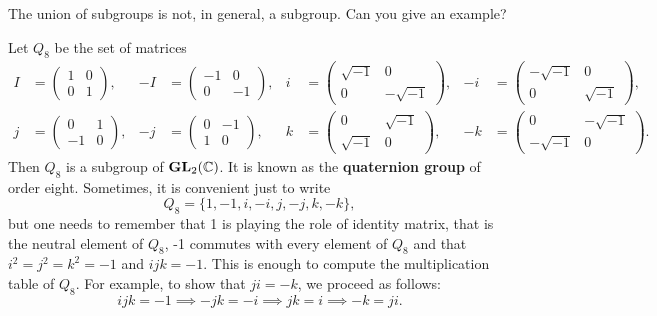 \begin{exercise}
\label{xca:union}
        The union of subgroups is not, in general, 
        a subgroup. Can you give an example? 
\end{exercise}

\begin{example}
    Let $Q_8$ be the set of matrices 
    \begin{align*}
        I&=\begin{pmatrix}
            1&0\\
            0&1
        \end{pmatrix},
        &
        -I&=\begin{pmatrix}
            -1&0\\
            0&-1
        \end{pmatrix},
        &
        i&=\begin{pmatrix}
            \sqrt{-1}&0\\
            0&-\sqrt{-1}
        \end{pmatrix},
        &
        -i&=\begin{pmatrix}
            -\sqrt{-1}&0\\
            0&\sqrt{-1}
        \end{pmatrix},\\
        j&=\begin{pmatrix}
            0&1\\
            -1&0
        \end{pmatrix},
        &
        -j&=\begin{pmatrix}
            0&-1\\
            1&0
        \end{pmatrix},
        &
        k&=\begin{pmatrix}
            0&\sqrt{-1}\\
            \sqrt{-1}&0
        \end{pmatrix},
        &
        -k &=\begin{pmatrix}
            0&-\sqrt{-1}\\
            -\sqrt{-1}&0
        \end{pmatrix}.
    \end{align*}
    Then $Q_8$ is a subgroup of $\mathbf{GL}_2(\mathbb{C})$. It is known as the \textbf{quaternion group} of order eight. Sometimes, it is convenient just to write
    \[
    Q_8=\{1,-1,i,-i,j,-j,k,-k\}, 
    \]
    but one needs to remember 
    that 1 is playing the role of identity matrix, that is the neutral element of $Q_8$, 
    -1 commutes with every element of $Q_8$ 
    and that $i^2=j^2=k^2=-1$ and $ijk=-1$. This is enough to compute the multiplication table
    of $Q_8$. For example, to show that $ji=-k$, we proceed as follows: 
    \[
    ijk=-1\implies -jk=-i\implies jk=i\implies -k=ji.
    \]
\end{example}

